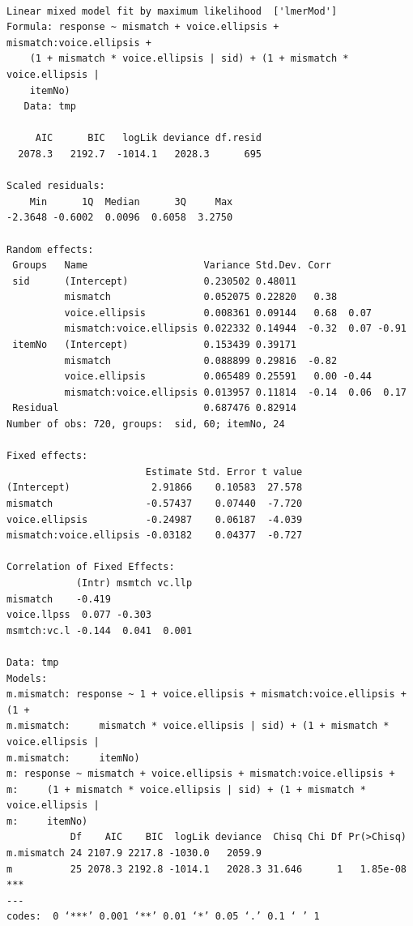 \documentclass[11pt]{article}
\begin{document}
\begin{verbatim}

Linear mixed model fit by maximum likelihood  ['lmerMod']
Formula: response ~ mismatch + voice.ellipsis + mismatch:voice.ellipsis +  
    (1 + mismatch * voice.ellipsis | sid) + (1 + mismatch * voice.ellipsis |  
    itemNo)
   Data: tmp

     AIC      BIC   logLik deviance df.resid 
  2078.3   2192.7  -1014.1   2028.3      695 

Scaled residuals: 
    Min      1Q  Median      3Q     Max 
-2.3648 -0.6002  0.0096  0.6058  3.2750 

Random effects:
 Groups   Name                    Variance Std.Dev. Corr             
 sid      (Intercept)             0.230502 0.48011                   
          mismatch                0.052075 0.22820   0.38            
          voice.ellipsis          0.008361 0.09144   0.68  0.07      
          mismatch:voice.ellipsis 0.022332 0.14944  -0.32  0.07 -0.91
 itemNo   (Intercept)             0.153439 0.39171                   
          mismatch                0.088899 0.29816  -0.82            
          voice.ellipsis          0.065489 0.25591   0.00 -0.44      
          mismatch:voice.ellipsis 0.013957 0.11814  -0.14  0.06  0.17
 Residual                         0.687476 0.82914                   
Number of obs: 720, groups:  sid, 60; itemNo, 24

Fixed effects:
                        Estimate Std. Error t value
(Intercept)              2.91866    0.10583  27.578
mismatch                -0.57437    0.07440  -7.720
voice.ellipsis          -0.24987    0.06187  -4.039
mismatch:voice.ellipsis -0.03182    0.04377  -0.727

Correlation of Fixed Effects:
            (Intr) msmtch vc.llp
mismatch    -0.419              
voice.llpss  0.077 -0.303       
msmtch:vc.l -0.144  0.041  0.001

Data: tmp
Models:
m.mismatch: response ~ 1 + voice.ellipsis + mismatch:voice.ellipsis + (1 + 
m.mismatch:     mismatch * voice.ellipsis | sid) + (1 + mismatch * voice.ellipsis | 
m.mismatch:     itemNo)
m: response ~ mismatch + voice.ellipsis + mismatch:voice.ellipsis + 
m:     (1 + mismatch * voice.ellipsis | sid) + (1 + mismatch * voice.ellipsis | 
m:     itemNo)
           Df    AIC    BIC  logLik deviance  Chisq Chi Df Pr(>Chisq)    
m.mismatch 24 2107.9 2217.8 -1030.0   2059.9                             
m          25 2078.3 2192.8 -1014.1   2028.3 31.646      1   1.85e-08 ***
---
codes:  0 ‘***’ 0.001 ‘**’ 0.01 ‘*’ 0.05 ‘.’ 0.1 ‘ ’ 1


\end{verbatim}
\end{document}
